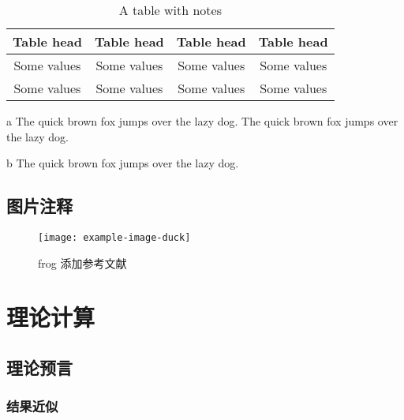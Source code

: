 \zhlipsum[2-3]


\begin{table}[h!]
	\caption{A table with notes}\label{tab:tablenotes}
	\centering
	\begin{threeparttable}
		\begin{tabular}{*4{c}}\toprule
			Table head\tnote{a} & Table head & Table head & Table head\tnote{b} \\ \midrule
			Some values & Some values & Some values & Some values \\
			Some values & Some values & Some values & Some values \\ \bottomrule
		\end{tabular}
		\begin{tablenotes}
			\footnotesize
			\item[a] The quick brown fox jumps over the lazy dog. The quick brown fox jumps over the lazy dog.
			\item[b] The quick brown fox jumps over the lazy dog.
		\end{tablenotes}
	\end{threeparttable}
\end{table}


\subsection{图片注释}

\begin{figure}[h!]
	\centering                        
	\texttt{[image: example-image-duck]}
	\caption[frog]{frog \footnotemark 添加参考文献\cite{2003张量分析} }
	\label{fig:pic1}
\end{figure}



\section{理论计算}%

\zhlipsum[2]

\subsection{理论预言}%

\zhlipsum[3]

\subsubsection{结果近似}%

\zhlipsum[4]